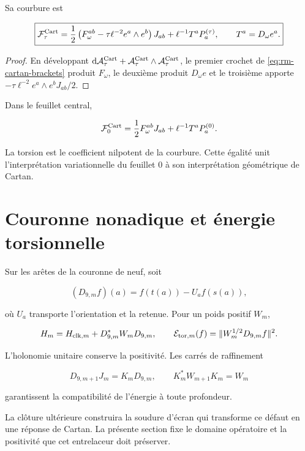 Sa courbure est

\begin{equation}
\boxed{
\mathcal F_\tau^{\rm Cart}
=\frac12\left(F_\omega^{ab}-\tau\ell^{-2}e^a\wedge e^b\right)J_{ab}
+\ell^{-1}T^aP_a^{(\tau)},
\qquad T^a=D_\omega e^a.}
\label{eq:rm-trit-cartan-curvature}
\end{equation}

\begin{proof}
En développant
\(\mathrm d\mathcal A_\tau^{\rm Cart}
+\mathcal A_\tau^{\rm Cart}\wedge\mathcal A_\tau^{\rm Cart}\), le premier
crochet de \cref{eq:rm-cartan-brackets} produit \(F_\omega\), le deuxième
produit \(D_\omega e\) et le troisième apporte
\(-\tau\ell^{-2}e^a\wedge e^bJ_{ab}/2\).
\end{proof}

Dans le feuillet central,

\[
\mathcal F_0^{\rm Cart}
=\frac12F_\omega^{ab}J_{ab}+\ell^{-1}T^aP_a^{(0)}.
\]

La torsion est le coefficient nilpotent de la courbure. Cette égalité unit
l'interprétation variationnelle du feuillet \(0\) à son interprétation
géométrique de Cartan.

\section{Couronne nonadique et énergie torsionnelle}

Sur les arêtes de la couronne de neuf, soit

\[
(D_{9,m}f)(a)=f(t(a))-U_a f(s(a)),
\]

où \(U_a\) transporte l'orientation et la retenue. Pour un poids positif \(W_m\),

\begin{equation}
H_m=H_{{\rm clk},m}+D_{9,m}^*W_mD_{9,m},
\qquad
\mathcal E_{{\rm tor},m}(f)
=\|W_m^{1/2}D_{9,m}f\|^2.
\label{eq:rm-nonadic-torsion-energy}
\end{equation}

L'holonomie unitaire conserve la positivité. Les carrés de raffinement

\[
D_{9,m+1}J_m=K_mD_{9,m},
\qquad
K_m^*W_{m+1}K_m=W_m
\]

garantissent la compatibilité de l'énergie à toute profondeur.

La clôture ultérieure construira la soudure d'écran qui transforme ce
défaut en une réponse de Cartan. La présente section fixe le domaine
opératoire et la positivité que cet entrelaceur doit préserver.

